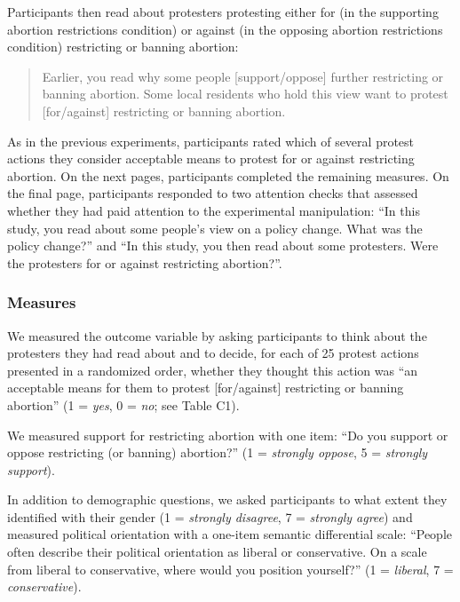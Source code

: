 \documentclass[12pt, letterpaper]{article}
\begin{document}
Participants then read about protesters protesting either for (in the
supporting abortion restrictions condition) or against (in the opposing
abortion restrictions condition) restricting or banning abortion:

\begin{quote}
Earlier, you read why some people {[}support/oppose{]} further
restricting or banning abortion. Some local residents who hold this view
want to protest {[}for/against{]} restricting or banning abortion.
\end{quote}

\noindent As in the previous experiments, participants rated which of
several protest actions they consider acceptable means to protest for or
against restricting abortion. On the next pages, participants completed
the remaining measures. On the final page, participants responded to two
attention checks that assessed whether they had paid attention to the
experimental manipulation: ``In this study, you read about some people's
view on a policy change. What was the policy change?'' and ``In this
study, you then read about some protesters. Were the protesters for or
against restricting abortion?''.

\hypertarget{measures-2}{%
\subsubsection{Measures}\label{measures-2}}

We measured the outcome variable by asking participants to think about
the protesters they had read about and to decide, for each of 25 protest
actions presented in a randomized order, whether they thought this
action was ``an acceptable means for them to protest {[}for/against{]}
restricting or banning abortion'' (1 = \emph{yes}, 0 = \emph{no}; see
Table C1).

We measured support for restricting abortion with one item: ``Do you
support or oppose restricting (or banning) abortion?'' (1 =
\emph{strongly oppose}, 5 = \emph{strongly support}).

In addition to demographic questions, we asked participants to what
extent they identified with their gender (1 = \emph{strongly disagree},
7 = \emph{strongly agree}) and measured political orientation with a
one-item semantic differential scale: ``People often describe their
political orientation as liberal or conservative. On a scale from
liberal to conservative, where would you position yourself?'' (1 =
\emph{liberal}, 7 = \emph{conservative}).
\end{document}
